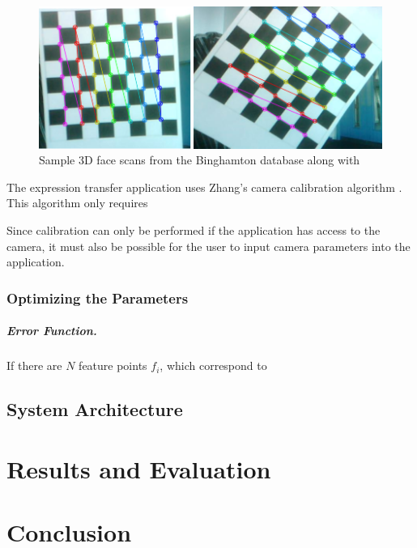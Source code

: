 \documentclass[11pt,a4paper]{report}
\begin{document}
\begin{figure}[H]
\begin{centering}
\includegraphics[scale=0.48]{images/chessboard_pattern.png}
\par\end{centering}

\caption{Sample 3D face scans from the Binghamton database along with }
\label{fg:chessboard}

\end{figure}

The expression transfer application uses Zhang's camera calibration algorithm
\cite{zhang}. This algorithm only requires 


Since calibration can only be performed if the
application has access to the camera, it must also be possible for the user to
input camera parameters into the application.

\subsection{Optimizing the Parameters}
\paragraph{Error Function.}
If there are $N$ feature points $f_i$, which correspond to 

\section{System Architecture}
\chapter{Results and Evaluation}

\chapter{Conclusion}




\end{document}
